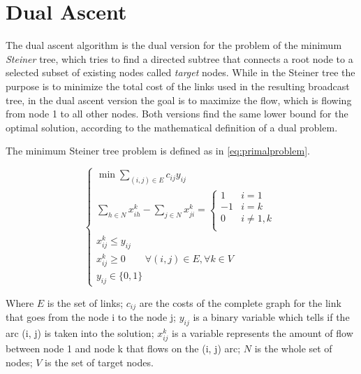 \chapter{Dual Ascent}\label{ch:dualascent}

The dual ascent algorithm is the dual version for the problem of the minimum
\emph{Steiner} tree, which tries to find a directed subtree that connects a root
node to a selected subset of existing nodes called \emph{target} nodes. While in
the Steiner tree the purpose is to minimize the total cost of the links used in
the resulting broadcast tree, in the dual ascent version the goal is to maximize
the flow, which is flowing from node 1 to all other nodes. Both versions find
the same lower bound for the optimal solution, according to the mathematical
definition of a dual problem.

The minimum Steiner tree problem is defined as in \eqref{eq:primalproblem}.

\begin{equation}\label{eq:primalproblem}
	\begin{cases}
		\min\sum\limits_{(i,j) \in E} c_{ij}y_{ij}\\[10pt]
		\sum\limits_{h \in N} x_{ih}^k - \sum\limits_{j \in N} x_{ji}^k
		=
		\begin{cases}
			1 & i = 1\\
			-1 & i = k\\
			0 & i \neq 1,k\\
		\end{cases}\\[10pt]
		x_{ij}^k \leq y_{ij}\\[10pt]
		x_{ij}^k \geq 0 \qquad \forall (i,j) \in E, \forall k \in
		V\\[10pt]
		y_{ij} \in \{0, 1\}
	\end{cases}
\end{equation}

Where \(E\) is the set of links; \(c_{ij}\) are the costs of the complete graph
for the link that goes from the node i to the node j; \(y_{ij}\) is a binary
variable which tells if the arc (i, j) is taken into the solution; \(x_{ij}^k\)
is a variable represents the amount of flow between node 1 and node k that flows
on the (i, j) arc; \(N\) is the whole set of nodes; \(V\) is the set of target
nodes.

